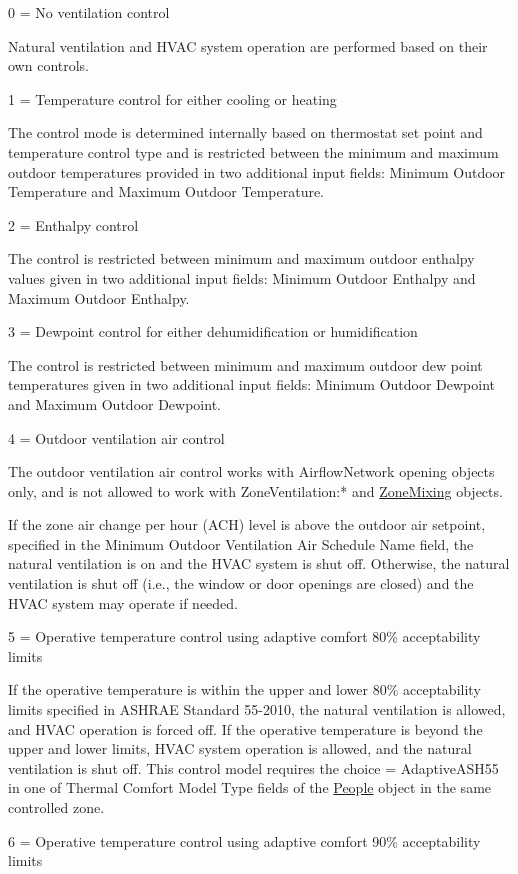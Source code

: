 \begin{description}
  \item
  0 = No ventilation control

  Natural ventilation and HVAC system operation are performed based on their own controls.
  \item
  1 = Temperature control for either cooling or heating

  The control mode is determined internally based on thermostat set point and temperature control type and is restricted between the minimum and maximum outdoor temperatures provided in two additional input fields: Minimum Outdoor Temperature and Maximum Outdoor Temperature.
  \item
  2 = Enthalpy control

  The control is restricted between minimum and maximum outdoor enthalpy values given in two additional input fields: Minimum Outdoor Enthalpy and Maximum Outdoor Enthalpy.
  \item
  3 = Dewpoint control for either dehumidification or humidification

  The control is restricted between minimum and maximum outdoor dew point temperatures given in two additional input fields: Minimum Outdoor Dewpoint and Maximum Outdoor Dewpoint.
  \item
  4 = Outdoor ventilation air control

  The outdoor ventilation air control works with AirflowNetwork opening objects only, and is not allowed to work with ZoneVentilation:* and \hyperref[zonemixing]{ZoneMixing} objects.

  If the zone air change per hour (ACH) level is above the outdoor air setpoint, specified in the Minimum Outdoor Ventilation Air Schedule Name field, the natural ventilation is on and the HVAC system is shut off. Otherwise, the natural ventilation is shut off (i.e., the window or door openings are closed) and the HVAC system may operate if needed.
  \item
  5 = Operative temperature control using adaptive comfort 80\% acceptability limits

  If the operative temperature is within the upper and lower 80\% acceptability limits specified in ASHRAE Standard 55-2010, the natural ventilation is allowed, and HVAC operation is forced off. If the operative temperature is beyond the upper and lower limits, HVAC system operation is allowed, and the natural ventilation is shut off.
  This control model requires the choice = AdaptiveASH55 in one of Thermal Comfort Model Type fields of the \hyperref[people]{People} object in the same controlled zone.
  \item
  6 = Operative temperature control using adaptive comfort 90\% acceptability limits


\end{description}
